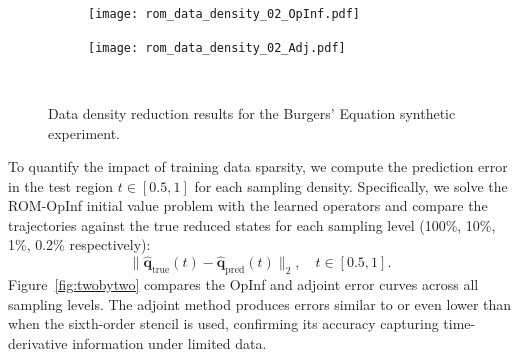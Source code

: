 \begin{figure}[h!]
  \begin{subfigure}[c]{0.49\textwidth}
      \centering
      \texttt{[image: rom\_data\_density\_02\_OpInf.pdf]}
  \end{subfigure} 
  \begin{subfigure}[c]{0.49\textwidth}
      \centering
      \texttt{[image: rom\_data\_density\_02\_Adj.pdf]}
  \end{subfigure} \\[1ex]
  \caption{Data density reduction results for the Burgers' Equation synthetic experiment.}
  \label{fig:five_by_two}
\end{figure}

\newpage


To quantify the impact of training data sparsity, we compute the prediction error in the test region $t\in[0.5,1]$ for each sampling density. Specifically, we solve the ROM-OpInf initial value problem with the learned operators and compare the trajectories against the true reduced states for each sampling level (100\%, 10\%, 1\%, 0.2\% respectively):\\
  $$\|\hat{\mathbf{q}}_{\mathrm{true}}(t) - \hat{\mathbf{q}}_{\mathrm{pred}}(t)\|_2,
  \quad t\in[0.5,1].$$
Figure~\ref{fig:twobytwo} compares the OpInf and adjoint error curves across all sampling levels. The adjoint method produces errors similar to or even lower than when the sixth-order stencil is used, confirming its accuracy capturing time-derivative information under limited data.

\vspace{0.7cm}

